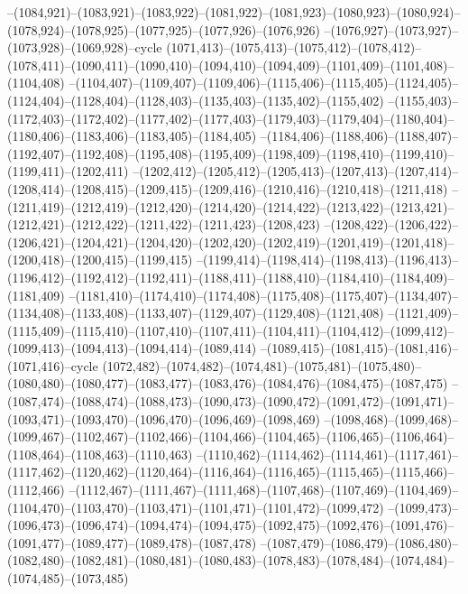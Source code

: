 --(1084,921)--(1083,921)--(1083,922)--(1081,922)--(1081,923)--(1080,923)--(1080,924)--(1078,924)--(1078,925)--(1077,925)--(1077,926)--(1076,926)
--(1076,927)--(1073,927)--(1073,928)--(1069,928)--cycle
(1071,413)--(1075,413)--(1075,412)--(1078,412)--(1078,411)--(1090,411)--(1090,410)--(1094,410)--(1094,409)--(1101,409)--(1101,408)--(1104,408)
--(1104,407)--(1109,407)--(1109,406)--(1115,406)--(1115,405)--(1124,405)--(1124,404)--(1128,404)--(1128,403)--(1135,403)--(1135,402)--(1155,402)
--(1155,403)--(1172,403)--(1172,402)--(1177,402)--(1177,403)--(1179,403)--(1179,404)--(1180,404)--(1180,406)--(1183,406)--(1183,405)--(1184,405)
--(1184,406)--(1188,406)--(1188,407)--(1192,407)--(1192,408)--(1195,408)--(1195,409)--(1198,409)--(1198,410)--(1199,410)--(1199,411)--(1202,411)
--(1202,412)--(1205,412)--(1205,413)--(1207,413)--(1207,414)--(1208,414)--(1208,415)--(1209,415)--(1209,416)--(1210,416)--(1210,418)--(1211,418)
--(1211,419)--(1212,419)--(1212,420)--(1214,420)--(1214,422)--(1213,422)--(1213,421)--(1212,421)--(1212,422)--(1211,422)--(1211,423)--(1208,423)
--(1208,422)--(1206,422)--(1206,421)--(1204,421)--(1204,420)--(1202,420)--(1202,419)--(1201,419)--(1201,418)--(1200,418)--(1200,415)--(1199,415)
--(1199,414)--(1198,414)--(1198,413)--(1196,413)--(1196,412)--(1192,412)--(1192,411)--(1188,411)--(1188,410)--(1184,410)--(1184,409)--(1181,409)
--(1181,410)--(1174,410)--(1174,408)--(1175,408)--(1175,407)--(1134,407)--(1134,408)--(1133,408)--(1133,407)--(1129,407)--(1129,408)--(1121,408)
--(1121,409)--(1115,409)--(1115,410)--(1107,410)--(1107,411)--(1104,411)--(1104,412)--(1099,412)--(1099,413)--(1094,413)--(1094,414)--(1089,414)
--(1089,415)--(1081,415)--(1081,416)--(1071,416)--cycle
(1072,482)--(1074,482)--(1074,481)--(1075,481)--(1075,480)--(1080,480)--(1080,477)--(1083,477)--(1083,476)--(1084,476)--(1084,475)--(1087,475)
--(1087,474)--(1088,474)--(1088,473)--(1090,473)--(1090,472)--(1091,472)--(1091,471)--(1093,471)--(1093,470)--(1096,470)--(1096,469)--(1098,469)
--(1098,468)--(1099,468)--(1099,467)--(1102,467)--(1102,466)--(1104,466)--(1104,465)--(1106,465)--(1106,464)--(1108,464)--(1108,463)--(1110,463)
--(1110,462)--(1114,462)--(1114,461)--(1117,461)--(1117,462)--(1120,462)--(1120,464)--(1116,464)--(1116,465)--(1115,465)--(1115,466)--(1112,466)
--(1112,467)--(1111,467)--(1111,468)--(1107,468)--(1107,469)--(1104,469)--(1104,470)--(1103,470)--(1103,471)--(1101,471)--(1101,472)--(1099,472)
--(1099,473)--(1096,473)--(1096,474)--(1094,474)--(1094,475)--(1092,475)--(1092,476)--(1091,476)--(1091,477)--(1089,477)--(1089,478)--(1087,478)
--(1087,479)--(1086,479)--(1086,480)--(1082,480)--(1082,481)--(1080,481)--(1080,483)--(1078,483)--(1078,484)--(1074,484)--(1074,485)--(1073,485)

